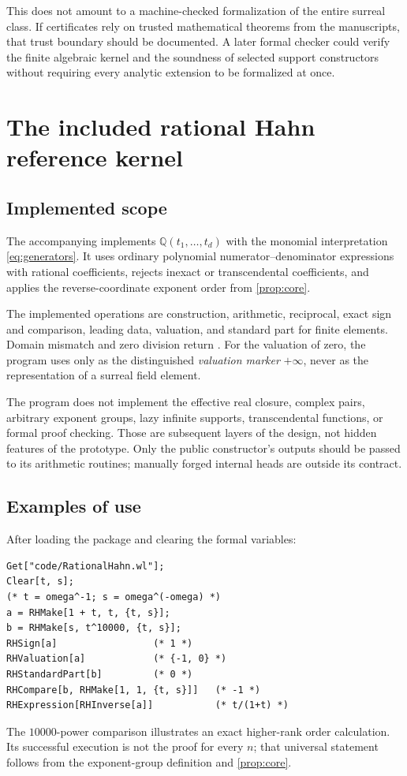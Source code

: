 \documentclass[11pt,letterpaper]{article}
\theoremstyle{definition}
\newcommand{\Q}{\mathbb Q}
\newcommand{\code}[1]{\texttt{\detokenize{#1}}}
\numberwithin{equation}{section}
\begin{document}
This does not amount to a machine-checked formalization of the entire surreal class. If certificates rely on trusted mathematical theorems from the manuscripts, that trust boundary should be documented. A later formal checker could verify the finite algebraic kernel and the soundness of selected support constructors without requiring every analytic extension to be formalized at once.

\section{The included rational Hahn reference kernel}\label{sec:prototype}
\subsection{Implemented scope}
The accompanying \code{code/RationalHahn.wl} implements $\Q(t_1,\ldots,t_d)$ with the monomial interpretation \eqref{eq:generators}. It uses ordinary polynomial numerator--denominator expressions with rational coefficients, rejects inexact or transcendental coefficients, and applies the reverse-coordinate exponent order from \cref{prop:core}.

The implemented operations are construction, arithmetic, reciprocal, exact sign and comparison, leading data, valuation, and standard part for finite elements. Domain mismatch and zero division return \code{Failure}. For the valuation of zero, the program uses \code{Infinity} only as the distinguished \emph{valuation marker} $+\infty$, never as the representation of a surreal field element.

The program does not implement the effective real closure, complex pairs, arbitrary exponent groups, lazy infinite supports, transcendental functions, or formal proof checking. Those are subsequent layers of the design, not hidden features of the prototype. Only the public constructor's outputs should be passed to its arithmetic routines; manually forged internal heads are outside its contract.

\subsection{Examples of use}
After loading the package and clearing the formal variables:
\begin{lstlisting}
Get["code/RationalHahn.wl"];
Clear[t, s];
(* t = omega^-1; s = omega^(-omega) *)
a = RHMake[1 + t, t, {t, s}];
b = RHMake[s, t^10000, {t, s}];
RHSign[a]                 (* 1 *)
RHValuation[a]            (* {-1, 0} *)
RHStandardPart[b]         (* 0 *)
RHCompare[b, RHMake[1, 1, {t, s}]]   (* -1 *)
RHExpression[RHInverse[a]]           (* t/(1+t) *)
\end{lstlisting}
The $10000$-power comparison illustrates an exact higher-rank order calculation. Its successful execution is not the proof for every $n$; that universal statement follows from the exponent-group definition and \cref{prop:core}.
\end{document}
